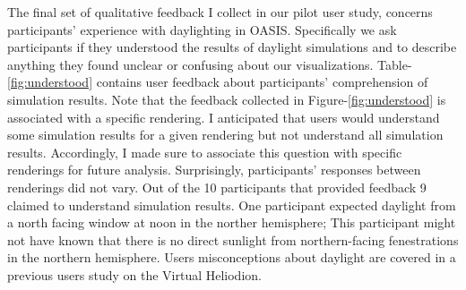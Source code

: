 The final set of qualitative feedback I collect in our pilot user study, concerns participants' experience with daylighting in OASIS.
Specifically we ask participants if they understood the results of daylight simulations and to describe anything they found unclear or confusing about our visualizations.
Table-\ref{fig:understood} contains user feedback about participants' comprehension of simulation results.
Note that the feedback collected in Figure-\ref{fig:understood} is associated with a specific rendering.
I anticipated that users would understand some simulation results for a given rendering but not understand all simulation results. Accordingly, I made sure to associate this question with specific renderings for future analysis.
Surprisingly, participants' responses between renderings did not vary. 
Out of the 10 participants that provided feedback 9 claimed to understand simulation results.
One participant expected daylight from a north facing window at noon in the norther hemisphere;
This participant might not have known that there is no direct sunlight from northern-facing fenestrations in the northern hemisphere.
Users misconceptions about daylight are covered in a previous users study on the Virtual Heliodion.

